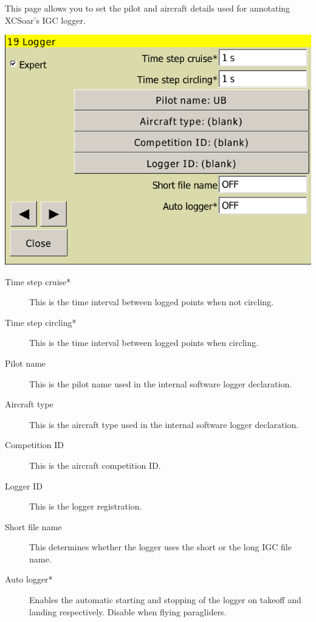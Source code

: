 \documentclass[a4paper,12pt]{refrep}
\begin{document}
This page allows you to set the pilot and aircraft details used for
annotating XCSoar's IGC logger. 

\begin{center}
\includegraphics[angle=0,width=\linewidth,keepaspectratio='true']{figures/config-17.png}
\end{center}

\begin{description}
\item[Time step cruise*]  This is the time interval between logged points when not circling. 
\item[Time step circling*]  This is the time interval between logged points when circling. 
\item[Pilot name]  This is the pilot name used in the internal software logger declaration.
\item[Aircraft type]  This is the aircraft type used in the internal software logger declaration.
\item[Competition ID]  This is the aircraft competition ID.
\item[Logger ID]  This is the logger registration.
\item[Short file name]  This determines whether the logger uses the short or the long IGC file name.
\item[Auto logger*] Enables the automatic starting and stopping of the logger on takeoff and landing respectively. Disable when flying paragliders.
\end{description}
\end{document}
